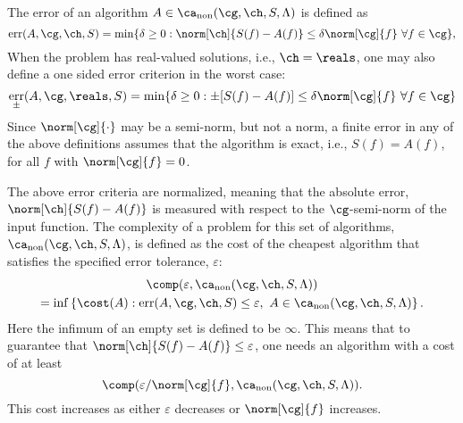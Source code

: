 \documentclass[final]{elsarticle}
\DeclareMathOperator{\err}{err}
\theoremstyle{definition}
\theoremstyle{remark}
\DeclareMathOperator{\fix}{non}
\begin{document}
The error of an algorithm $A  \in \ca_{\fix}(\cg,\ch,S,\Lambda)$ is defined  as
\begin{equation} \label{errdefworst}
\err(A,\cg,\ch,S)
= \min\{ \delta \ge 0 : \norm[\ch]{S(f) -  A(f)} \le \delta \norm[\cg]{f} \ \forall f \in \cg \},
\end{equation}
When the problem has real-valued solutions, i.e., $\ch=\reals$, one may also define a one sided error criterion in the worst case:
\begin{equation}\label{errpmdefworst}
\err_{\pm}(A,\cg,\reals,S) = 
\min \{ \delta \ge 0 : \pm[S(f) -  A(f)] \le \delta \norm[\cg]{f} \ \forall f \in \cg \} 
\end{equation}
Since $\norm[\cg]{\cdot}$ may be a semi-norm, but not a norm, a finite error in any of the above definitions assumes that the algorithm is exact, i.e., $S(f)=A(f)$, for all $f$ with $\norm[\cg]{f}=0$.

The above error criteria are normalized, meaning that the absolute error, $\norm[\ch]{S(f) -  A(f)}$ is measured with respect to the $\cg$-semi-norm of the input function. The complexity of a problem for this set of algorithms, $\ca_{\fix}(\cg,\ch,S,\Lambda)$, is defined as the cost of the cheapest algorithm that satisfies the specified error tolerance, $\varepsilon$:
\begin{multline} \label{fixcostcomplex}
\comp(\varepsilon,\ca_{\fix}(\cg,\ch,S,\Lambda)) \\
= \inf\left\{\cost(A) : \err(A,\cg,\ch,S) \le \varepsilon, \ A \in \ca_{\fix}(\cg,\ch,S,\Lambda) \right \}.
\end{multline}
Here the infimum of an empty set is defined to be $\infty$.  This means that to guarantee that $\norm[\ch]{S(f) -  A(f)} \le \varepsilon$, one needs an algorithm with a cost of at least 
\[
\comp(\varepsilon/\norm[\cg]{f},\ca_{\fix}(\cg,\ch,S,\Lambda)).
\]
This cost increases as either $\varepsilon$ decreases or $\norm[\cg]{f}$ increases.
\end{document}
